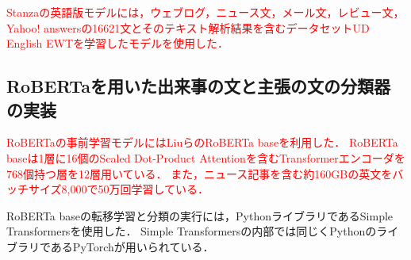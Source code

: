 \documentclass[12pt,a4j]{jreport}
\begin{document}
\textcolor{red}{
  Stanzaの英語版モデルには，ウェブログ，ニュース文，メール文，レビュー文，Yahoo! answersの16621文とそのテキスト解析結果を含むデータセットUD English EWTを学習したモデルを使用した． 
}



\subsection{RoBERTaを用いた出来事の文と主張の文の分類器の実装}
\textcolor{red}{
RoBERTaの事前学習モデルにはLiuらのRoBERTa baseを利用した\cite{liu_roberta_2019}．
RoBERTa baseは1層に16個のScaled Dot-Product Attentionを含むTransformerエンコーダを768個持つ層を12層用いている．
また，ニュース記事を含む約160GBの英文をバッチサイズ8,000で50万回学習している．
}


RoBERTa baseの転移学習と分類の実行には，PythonライブラリであるSimple Transformersを使用した．
Simple Transformersの内部では同じくPythonのライブラリであるPyTorchが用いられている．
\end{document}
